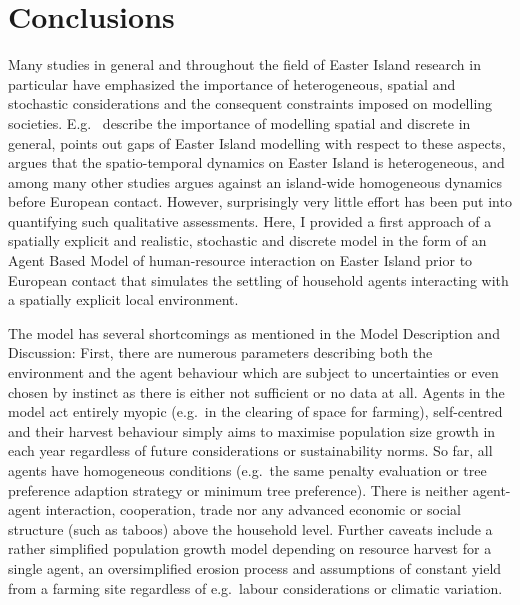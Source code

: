 
\chapter{Conclusions}

Many studies in general and throughout the field of Easter Island research in particular have emphasized the importance of heterogeneous, spatial and stochastic considerations and the consequent constraints imposed on modelling societies.
E.g.\ \citet{Bousquet2004} describe the importance of modelling spatial and discrete in general, \citet{Merico2017} points out gaps of Easter Island modelling with respect to these aspects, \citet{Rull2020} argues that the spatio-temporal dynamics on Easter Island is heterogeneous, and \citet{Stevenson2015} among many other studies argues against an island-wide homogeneous dynamics before European contact.
However, surprisingly very little effort has been put into quantifying such qualitative assessments.
Here, I provided a first approach of a spatially explicit and realistic, stochastic and discrete model in the form of an Agent Based Model of human-resource interaction on Easter Island prior to European contact that simulates the settling of household agents interacting with a spatially explicit local environment. 

The model has several shortcomings as mentioned in the Model Description and Discussion:
First, there are numerous parameters describing both the environment and the agent behaviour which are subject to uncertainties or even chosen by instinct as there is either not sufficient or no data at all.
Agents in the model act entirely myopic (e.g.\ in the clearing of space for farming), self-centred and their harvest behaviour simply aims to maximise population size growth in each year regardless of future considerations or sustainability norms. 
So far, all agents have homogeneous conditions (e.g.\ the same penalty evaluation or tree preference adaption strategy or minimum tree preference).
There is neither agent-agent interaction, cooperation, trade nor any advanced economic or social structure (such as taboos) above the household level. 
Further caveats include a rather simplified population growth model depending on resource harvest for a single agent, an oversimplified erosion process and assumptions of constant yield from a farming site regardless of e.g.\ labour considerations or climatic variation.


